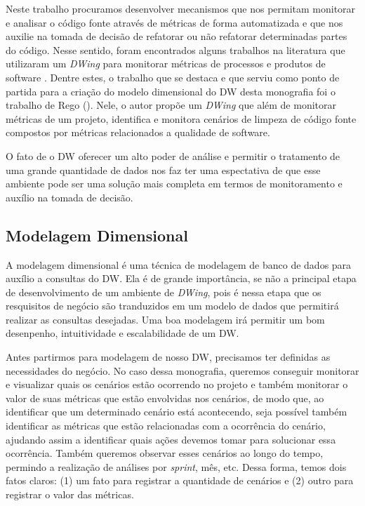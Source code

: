 Neste trabalho procuramos desenvolver mecanismos que nos permitam monitorar e analisar o código fonte através de métricas de forma automatizada e que nos auxilie na tomada de decisão de refatorar ou não refatorar determinadas partes do código. 
%
Nesse sentido, foram encontrados alguns trabalhos na literatura que utilizaram um \emph{DWing} para monitorar métricas de processos e produtos de software \cite{Folleco2007} \cite{Silveira2010}\cite{mazuco2011} \cite{rego2014}. Dentre estes, o trabalho que se destaca e que serviu como ponto de partida para a criação do modelo dimensional do DW desta monografia foi o trabalho de Rego (\citeyear{rego2014}). Nele, o autor propõe um \emph{DWing} que além de monitorar métricas de um projeto,  identifica e monitora cenários de limpeza de código fonte compostos por métricas relacionados a qualidade de software.

% 
O fato de o DW oferecer um alto poder de análise e permitir o tratamento de uma grande quantidade de dados nos faz ter uma espectativa de que esse ambiente pode ser uma solução mais completa em termos de monitoramento e auxílio na tomada de decisão. 



\subsection{Modelagem Dimensional}

A modelagem dimensional é uma técnica de modelagem de banco de dados para auxílio a consultas do DW. Ela é de grande importância, se não a principal etapa de desenvolvimento de um ambiente de \emph{DWing}, pois é nessa etapa que os resquisitos de negócio são tranduzidos em um modelo de dados que permitirá realizar as consultas desejadas. Uma boa modelagem irá permitir um bom desenpenho, intuitividade e escalabilidade de um DW.

%
Antes partirmos para modelagem de nosso DW,  precisamos ter definidas as necessidades do negócio. No caso dessa monografia, queremos conseguir monitorar e visualizar quais os cenários estão ocorrendo no projeto e também monitorar o valor de suas métricas que estão envolvidas nos cenários, de modo que, ao identificar que um determinado cenário está acontecendo, seja possível também identificar as métricas que estão relacionadas com a ocorrência do cenário, ajudando assim a identificar quais ações devemos tomar para solucionar essa ocorrência. Também queremos observar esses cenários ao longo do tempo, permindo a realização de análises por \emph{sprint}, mês, etc. Dessa forma, temos dois fatos claros: (1) um fato para registrar a quantidade de cenários e (2) outro para registrar o valor das métricas.


